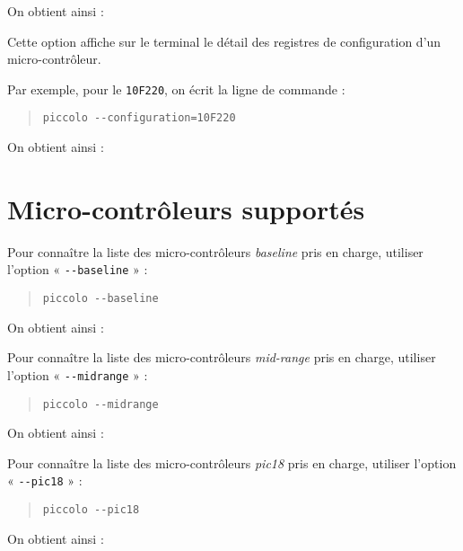 On obtient ainsi : 
{\footnotesize }



Cette option affiche sur le terminal le détail des registres de configuration d'un micro-contrôleur.

Par exemple, pour le \texttt{10F220}, on écrit la ligne de commande :
\begin{quote}
  \texttt{piccolo -{}-configuration=10F220}
\end{quote}

On obtient ainsi : 
{\footnotesize }









\section{Micro-contrôleurs supportés}


Pour connaître la liste des micro-contrôleurs \emph{baseline} pris en charge, utiliser l’option « \texttt{-{}-baseline} » :
\begin{quote}
\texttt{piccolo -{}-baseline}
\end{quote}

On obtient ainsi : 
{\footnotesize }







Pour connaître la liste des micro-contrôleurs \emph{mid-range} pris en charge, utiliser l’option « \texttt{-{}-midrange} » :
\begin{quote}
\texttt{piccolo -{}-midrange}
\end{quote}

On obtient ainsi : 
{\footnotesize }


Pour connaître la liste des micro-contrôleurs \emph{pic18} pris en charge, utiliser l’option « \texttt{-{}-pic18} » :
\begin{quote}
\texttt{piccolo -{}-pic18}
\end{quote}


On obtient ainsi : 
{\footnotesize }

